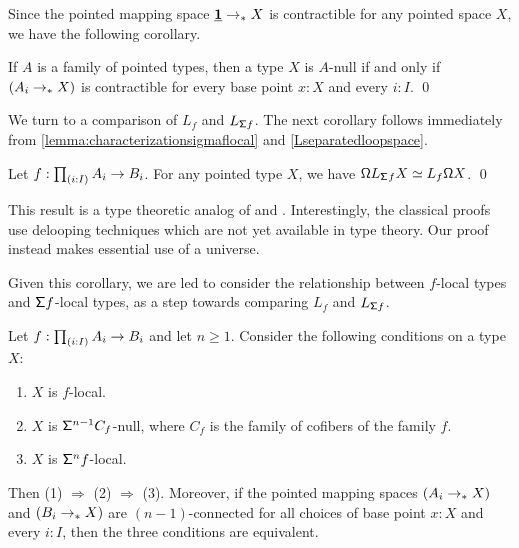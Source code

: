 Since the pointed mapping space $\underline{\mathbf{1}}\to_\ast X$ is contractible for any pointed space $X$, we have the following corollary.

\begin{cor}\label{cor:pointed_null}
If $A$ is a family of pointed types, then a type $X$ is $A$-null
if and only if $(A_i \to_{\ast} X)$ is contractible
for every base point $x : X$ and every $i : I$. \qed
\end{cor}

We turn to a comparison of $L_f$ and $L_{\mathsf{\Sigma} f}$.
The next corollary follows immediately from \cref{lemma:characterizationsigmaflocal}
and \cref{Lseparatedloopspace}.

\begin{cor}\label{remark:commutativitylooplocalization}
    Let $f : \prd{i:I} A_i \to B_i$.
    For any pointed type $X$, we have
    $\mathsf{\Omega} L_{\mathsf{\Sigma}^{}{f}} X \simeq L_f \mathsf{\Omega} X$. \qed
\end{cor}

This result is a type theoretic analog of \cite[Theorem 3.1]{Bousfield} and \cite[3.A.1]{DrorFarjoun}.
Interestingly, the classical proofs use delooping techniques which are not yet available in type theory.
Our proof instead makes essential use of a universe.

Given this corollary, we are led to consider the relationship between $f$-local types and $\mathsf{\Sigma} f$-local types, as a step towards comparing $L_f$ and $L_{\mathsf{\Sigma} f}$.

\begin{thm}\label{theorem:characterizinglocalness}
    Let $f: \prd{i:I} A_i \to B_i$ and let $n \geq 1$.
    Consider the following conditions on a type $X$:
    \begin{enumerate}
    \item $X$ is $f$-local.
    \item $X$ is $\mathsf{\Sigma}^{n-1} C_f$-null,
    where $C_f$ is the family of cofibers of the family $f$. 
    \item $X$ is $\mathsf{\Sigma}^{n} f$-local.
    \end{enumerate}
    Then (1) $\Rightarrow$ (2) $\Rightarrow$ (3).
    Moreover, if the pointed mapping spaces $(A_i \to_{\ast} X)$ and $(B_i \to_{\ast} X)$
    are $(n-1)$-connected for all choices of base point $x : X$
    and every $i : I$,
    then the three conditions are equivalent.
\end{thm}

